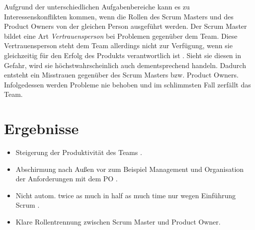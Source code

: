 \documentclass[5pt, final]{beamer}
\begin{document}
\begin{frame}[t]
\begin{multicols}{3}
            Aufgrund der unterschiedlichen Aufgabenbereiche kann es zu Interessenskonflikten kommen, wenn die Rollen des Scrum Masters und des Product Owners von der gleichen Person ausgeführt werden.
            Der Scrum Master bildet eine Art \textit{Vertrauensperson} bei Problemen gegenüber dem Team.
            Diese Vertrauensperson steht dem Team allerdings nicht zur Verfügung, wenn sie gleichzeitig für den Erfolg des Produkts verantwortlich ist \cite{me-company}.
            Sieht sie diesen in Gefahr, wird sie höchstwahrscheinlich auch dementsprechend handeln.
            Dadurch entsteht ein Misstrauen gegenüber des Scrum Masters bzw. Product Owners.
            Infolgedessen werden Probleme nie behoben und im schlimmsten Fall zerfällt das Team.
			
			\section{Ergebnisse}
			
            \begin{itemize}
    			\item Steigerung der Produktivität des Teams \cite{vantighem24}.
    			\item Abschirmung nach Außen vor zum Beispiel Management und Organisation der Anforderungen mit dem PO \cite{meindl12}.
                \item Nicht autom. twice as much in half as much time nur wegen Einführung Scrum \cite{sutherland14}.
                \item Klare Rollentrennung zwischen Scrum Master und Product Owner.
            \end{itemize}
			
			

\end{multicols}
\end{frame}
\end{document}
